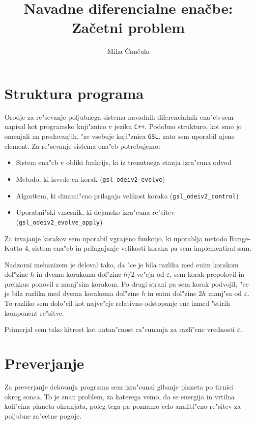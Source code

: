 \documentclass[a4paper,10pt]{article}
\title{Navadne diferencialne ena\v cbe: \\ Za\v cetni problem}
\author{Miha \v Can\v cula}
\newcommand{\eps}{\varepsilon}
\begin{document}
\maketitle

\section{Struktura programa}

Orodje za re"sevanje poljubnega sistema navadnih diferencialnih ena"cb sem napisal kot programsko knji"znico v jeziku \texttt{C++}. Podobno strukturo, kot smo jo omenjali na predavanjih, "ze vsebuje knji"znica \texttt{GSL}, zato sem uporabil njene element. Za re"sevanje sistema ena"cb potrebujemo:

\begin{itemize}
 \item Sistem ena"cb v obliki funkcije, ki iz trenutnega stanja izra"cuna odvod
 \item Metodo, ki izvede en korak (\texttt{gsl\_odeiv2\_evolve})
 \item Algoritem, ki dinami"cno prilagaja velikost koraka (\texttt{gsl\_odeiv2\_control})
 \item Uporabni"ski vmesnik, ki dejansko izra"cuna re"sitev (\texttt{gsl\_odeiv2\_evolve\_apply})
\end{itemize}

Za izvajanje korakov sem uporabil vgrajeno funkcijo, ki uporablja metodo Runge-Kutta 4, sistem ena"cb in prilagajanje velikosti koraka pa sem implementiral sam. 

Nadzorni mehanizem je deloval tako, da "ce je bila razlika med enim korakom dol"zine $h$ in dvema korakoma dol"zine $h/2$ ve"cja od $\eps$, sem korak prepolovil in preizkus ponovil z manj"sim korakom. Po drugi strani pa sem korak podvojil, "ce je bila razlika med dvema korakoma dol"zine $h$ in enim dol"zine $2h$ manj"sa od $\eps$. To razliko sem dolo"cil kot najve"cje relativno odstopanje ene izmed "stirih komponent re"sitve. 

Primerjal sem tako hitrost kot natan"cnost ra"cunanja za razli"cne vrednosti $\eps$. 

\section{Preverjanje}

Za preverjanje delovanja programa sem izra"cunal gibanje planeta po tirnici okrog sonca. To je znan problem, za katerega vemo, da se energija in vrtilna koli"cina planeta ohranjata, poleg tega pa poznamo celo analiti"cno re"sitev za poljubne za"cetne pogoje. 
\end{document}
